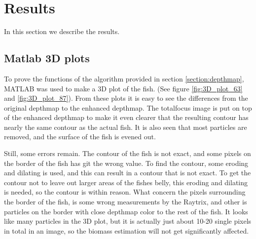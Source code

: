 \section{Results}\label{results}
In this section we describe the results.


\subsection{Matlab 3D plots}
To prove the functions of the algorithm provided in section \ref{section:depthmap}, MATLAB was used to make a 3D plot of the fish. (See figure \ref{fig:3D_plot_63} and \ref{fig:3D_plot_87}). From these plots it is easy to see the differences from the original depthmap to the enhanced depthmap. The totalfocus image is put on top of the enhanced depthmap to make it even clearer that the resulting contour has nearly the same contour as the actual fish. It is also seen that most particles are removed, and the surface of the fish is evened out.

Still, some errors remain. The contour of the fish is not exact, and some pixels on the border of the fish has git the wrong value. To find the contour, some eroding and dilating is used, and this can result in a contour that is not exact. To get the contour not to leave out larger areas of the fishes belly, this eroding and dilating is needed, so the contour is within reason. What concern the pixels surrounding the border of the fish, is some wrong measurements by the Raytrix, and other is particles on the border with close depthmap color to the rest of the fish. It looks like many particles in the 3D plot, but it is actually just about 10-20 single pixels in total in an image, so the biomass estimation will not get significantly affected.  


